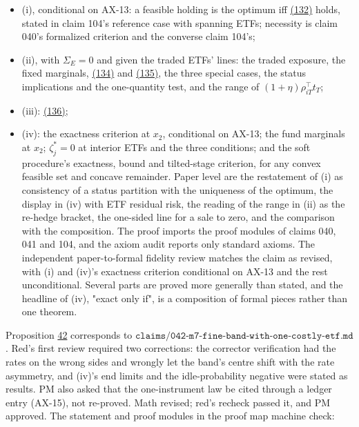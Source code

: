 \documentclass[11pt]{article}
\begin{document}
\begin{itemize}
  \item (i), conditional on AX-13: a feasible holding is the optimum iff
  \hyperref[eq:132]{(132)} holds, stated in claim 104's reference case with spanning ETFs;
  necessity is claim 040's formalized criterion and the converse claim
  104's;
  \item (ii), with \(\Sigma_E=0\) and given the traded ETFs' lines: the traded
  exposure, the fixed marginals, \hyperref[eq:134]{(134)} and \hyperref[eq:135]{(135)}, the three special
  cases, the status implications and the one-quantity test, and the
  range of \((1+\eta)\rho_{iT}^\top t_T\);
  \item (iii): \hyperref[eq:136]{(136)};
  \item (iv): the exactness criterion at \(x_2\), conditional on AX-13; the fund
  marginals at \(x_2\); \(\zeta^*_j=0\) at interior ETFs and the three conditions;
  and the soft procedure's exactness, bound and tilted-stage criterion,
  for any convex feasible set and concave remainder.
Paper level are the restatement of (i) as consistency of a status
partition with the uniqueness of the optimum, the display in (iv) with
ETF residual risk, the reading of the range in (ii) as the re-hedge
bracket, the one-sided line for a sale to zero, and the comparison
with the composition. The proof imports the proof modules of claims
040, 041 and 104, and the axiom audit reports only standard axioms.
The independent paper-to-formal fidelity review matches the claim as
revised, with (i) and (iv)'s exactness criterion conditional on AX-13
and the rest unconditional. Several parts are proved more generally
than stated, and the headline of (iv), "exact only if", is a
composition of formal pieces rather than one theorem.
\end{itemize}

Proposition \hyperref[res:Proposition-42]{42} corresponds to
\(\texttt{claims/042-m7-fine-band-with-one-costly-etf.md}\). Red's first review
required two corrections: the corrector verification had the rates on
the wrong sides and wrongly let the band's centre shift with the rate
asymmetry, and (iv)'s end limits and the idle-probability negative were
stated as results. PM also asked that the one-instrument law be cited
through a ledger entry (AX-15), not re-proved. Math revised; red's
recheck passed it, and PM approved. The statement and proof modules in
the proof map machine check:
\end{document}

